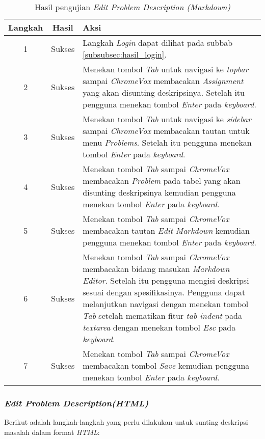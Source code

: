 \begin{table}[H]
	\centering
	\caption{Hasil pengujian \textit{Edit Problem Description (Markdown)}}
	\label{tab:hasil_edit_problem_description_markdown}
	\begin{tabular}{|c|c|p{12cm}|}
		\toprule
		Langkah & Hasil & Aksi\\
		\midrule
		1 & Sukses & Langkah \textit{Login} dapat dilihat pada subbab \ref{subsubsec:hasil_login}.\\
		2 & Sukses & Menekan tombol \textit{Tab} untuk navigasi ke \textit{topbar} sampai \textit{ChromeVox} membacakan \textit{Assignment} yang akan disunting deskripsinya. Setelah itu pengguna menekan tombol \textit{Enter} pada \textit{keyboard}.\\
		3 & Sukses & Menekan tombol \textit{Tab} untuk navigasi ke \textit{sidebar} sampai \textit{ChromeVox} membacakan tautan untuk menu \textit{Problems}. Setelah itu pengguna menekan tombol \textit{Enter} pada \textit{keyboard}.\\
		4 & Sukses & Menekan tombol \textit{Tab} sampai \textit{ChromeVox} membacakan \textit{Problem} pada tabel yang akan disunting deskripsinya kemudian pengguna menekan tombol \textit{Enter} pada \textit{keyboard}.\\
		5 & Sukses & Menekan tombol \textit{Tab} sampai \textit{ChromeVox} membacakan tautan \textit{Edit Markdown} kemudian pengguna menekan tombol \textit{Enter} pada \textit{keyboard}.\\
		6 & Sukses & Menekan tombol \textit{Tab} sampai \textit{ChromeVox} membacakan bidang masukan \textit{Markdown Editor}. Setelah itu pengguna mengisi deskripsi sesuai dengan spesifikasinya. Pengguna dapat melanjutkan navigasi dengan menekan tombol \textit{Tab} setelah mematikan fitur \textit{tab indent} pada \textit{textarea} dengan menekan tombol \textit{Esc} pada \textit{keyboard}.\\
		7 & Sukses & Menekan tombol \textit{Tab} sampai \textit{ChromeVox} membacakan tombol \textit{Save} kemudian pengguna menekan tombol \textit{Enter} pada \textit{keyboard}.\\
		\bottomrule
	\end{tabular}
\end{table}

\subsubsection{\textit{Edit Problem Description(HTML)}}
\label{subsubsec:skenario_edit_problem_description_html}
Berikut adalah langkah-langkah yang perlu dilakukan untuk sunting deskripsi masalah dalam format \textit{HTML}:


